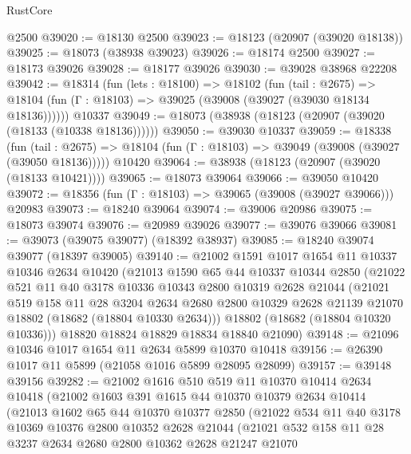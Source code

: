 \begin{lexlean}{RustCore}
\begin{coremodule}
    @2500
@39020 := @18130 @2500
@39023 := @18123 (@20907 (@39020 @18138))
@39025 := @18073 (@38938 @39023)
@39026 := @18174 @2500
@39027 := @18173 @39026
@39028 := @18177 @39026
@39030 := @39028 @38968 @22208
@39042 := @18314
    (fun (lets : @18100) =>
    @18102
      (fun (tail : @2675) =>
      @18104 (fun (Γ : @18103) => @39025 (@39008 (@39027 (@39030 @18134 @18136))))))
    @10337
@39049 := @18073 (@38938 (@18123 (@20907 (@39020 (@18133 (@10338 @18136))))))
@39050 := @39030 @10337
@39059 := @18338
    (fun (tail : @2675) => @18104 (fun (Γ : @18103) => @39049 (@39008 (@39027 (@39050 @18136)))))
    @10420
@39064 := @38938 (@18123 (@20907 (@39020 (@18133 @10421))))
@39065 := @18073 @39064
@39066 := @39050 @10420
@39072 := @18356 (fun (Γ : @18103) => @39065 (@39008 (@39027 @39066))) @20983
@39073 := @18240 @39064
@39074 := @39006 @20986
@39075 := @18073 @39074
@39076 := @20989 @39026
@39077 := @39076 @39066
@39081 := @39073 (@39075 @39077) (@18392 @38937)
@39085 := @18240 @39074 @39077 (@18397 @39005)
@39140 := @21002
    @1591
    @1017
    @1654
    @11
    @10337
    @10346
    @2634
    @10420
    (@21013
      @1590
      @65
      @44
      @10337
      @10344
      @2850
      (@21022
        @521
        @11
        @40
        @3178
        @10336
        @10343
        @2800
        @10319
        @2628
        @21044
        (@21021
          @519
          @158
          @11
          @28
          @3204
          @2634
          @2680
          @2800
          @10329
          @2628
          @21139
          @21070
          @18802
          (@18682 (@18804 @10330 @2634)))
        @18802
        (@18682 (@18804 @10320 @10336)))
      @18820
      @18824
      @18829
      @18834
      @18840
      @21090)
@39148 := @21096 @10346 @1017 @1654 @11 @2634 @5899 @10370 @10418
@39156 := @26390 @1017 @11 @5899 (@21058 @1016 @5899 @28095 @28099)
@39157 := @39148 @39156
@39282 := @21002
    @1616
    @510
    @519
    @11
    @10370
    @10414
    @2634
    @10418
    (@21002
      @1603
      @391
      @1615
      @44
      @10370
      @10379
      @2634
      @10414
      (@21013
        @1602
        @65
        @44
        @10370
        @10377
        @2850
        (@21022
          @534
          @11
          @40
          @3178
          @10369
          @10376
          @2800
          @10352
          @2628
          @21044
          (@21021
            @532
            @158
            @11
            @28
            @3237
            @2634
            @2680
            @2800
            @10362
            @2628
            @21247
            @21070

\end{coremodule}
\end{lexlean}
